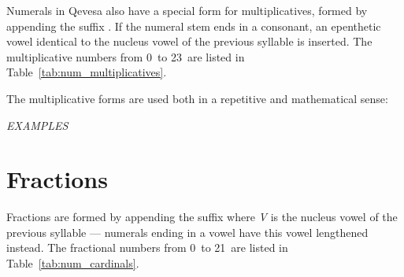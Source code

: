 \documentclass[grammar]{subfiles}
\begin{document}
  Numerals in Qevesa also have a special form for multiplicatives, formed by appending the suffix .  If the numeral stem ends in a consonant, an epenthetic vowel identical to the nucleus vowel of the previous syllable is inserted.  The multiplicative numbers from 0\dec\ to 23\dec\ are listed in Table~\ref{tab:num_multiplicatives}.

  \begin{table}[htpb]\small\capstart
      \qquad
      \caption{Multiplicative numerals from 0\dec\ to 23\dec\label{tab:num_multiplicatives}}
  \end{table}

  The multiplicative forms are used both in a repetitive and mathematical sense:

  \begin{exe}
    \ex \emph{EXAMPLES}
  \end{exe}

  \section{Fractions}
  \label{sec:num_fractions}

  Fractions are formed by appending the suffix  where \textit{V} is the nucleus vowel of the previous syllable — numerals ending in a vowel have this vowel lengthened instead.  The fractional numbers from 0\dec\ to 21\dec\ are listed in Table~\ref{tab:num_cardinals}.
\end{document}
